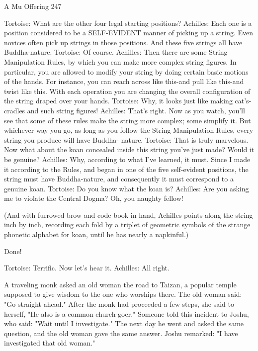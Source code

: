 A Mu Offering                                                                               247

Tortoise: What are the other four legal starting positions?
Achilles: Each one is a position considered to be a SELF-EVIDENT manner of picking
   up a string. Even novices often pick up strings in those positions. And these five
   strings all have Buddha-nature. Tortoise: Of course.
Achilles: Then there are some String Manipulation Rules, by which you can make more
   complex string figures. In particular, you are allowed to modify your string by doing
   certain basic motions of the hands. For instance, you can reach across like this-and
   pull like this-and twist like this. With each operation you are changing the overall
   configuration of the string draped over your hands.
Tortoise: Why, it looks just like making cat's-cradles and such string figures!
Achilles: That's right. Now as you watch, you'll see that some of these rules make the
   string more complex; some simplify it. But whichever way you go, as long as you
   follow the String Manipulation Rules, every string you produce will have Buddha-
   nature.
Tortoise: That is truly marvelous. Now what about the koan concealed inside this string
   you've just made? Would it be genuine?
Achilles: Why, according to what I've learned, it must. Since I made it according to the
   Rules, and began in one of the five self-evident positions, the string must have
   Buddha-nature, and consequently it must correspond to a genuine koan.
Tortoise: Do you know what the koan is?
Achilles: Are you asking me to violate the Central Dogma? Oh, you naughty fellow!

   (And with furrowed brow and code book in hand, Achilles points along the string
   inch by inch, recording each fold by a triplet of geometric symbols of the strange
   phonetic alphabet for koan, until he has nearly a napkinful.)

   Done!

Tortoise: Terrific. Now let's hear it.
Achilles: All right.

   A traveling monk asked an old woman the road to Taizan, a popular temple
   supposed to give wisdom to the one who worships there. The old woman said:
   "Go straight ahead." After the monk had proceeded a few steps, she said to herself,
   "He also is a common church-goer." Someone told this incident to Joshu, who
   said: "Wait until I investigate." The next day he went and asked the same question,
   and the old woman gave the same answer. Joshu remarked: "I have investigated
   that old woman."

